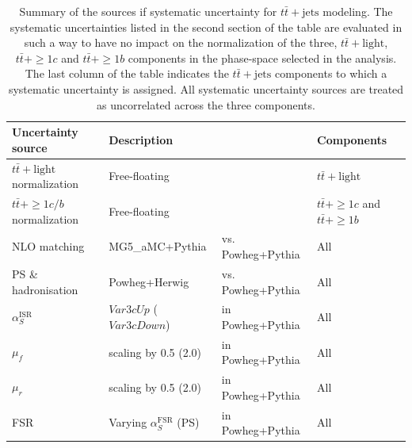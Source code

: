 \begin{table}[hp]
  \centering
  \begin{tabular*}{150mm}{@{\extracolsep{\fill}}llll}
    \hline\hline
    Uncertainty source & \multicolumn{2}{l}{Description} & Components\\
    \hline
    $t\bar{t}+\text{light}$ normalization & \multicolumn{2}{l}{Free-floating} & $t\bar{t}+\text{light}$\\
    $t\bar{t}+\geq1c/b$ normalization & \multicolumn{2}{l}{Free-floating} & $t\bar{t}+\geq{1c}$ and $t\bar{t}+\geq{1b}$\\
    \hline
    NLO matching & MG5\_aMC+Pythia & vs. Powheg+Pythia & All \\
    PS \& hadronisation & Powheg+Herwig & vs. Powheg+Pythia & All \\
    $\alpha_{S}^{\text{ISR}}$ & $Var3cUp$ ($Var3cDown$) & in Powheg+Pythia & All \\
    $\mu_{f}$ & scaling by 0.5 (2.0) & in Powheg+Pythia & All \\
    $\mu_{r}$ & scaling by 0.5 (2.0) & in Powheg+Pythia & All \\
    FSR & Varying $\alpha_{S}^{\text{FSR}}$ (PS) & in Powheg+Pythia & All \\
    \hline\hline
  \end{tabular*}
  \caption{Summary of the sources if systematic uncertainty for $t\bar{t}+\text{jets}$ modeling. The systematic uncertainties listed in the second section of the table are evaluated in such a way to have no impact on the normalization of the three, $t\bar{t}+\text{light}$, $t\bar{t}+\geq1c$ and $t\bar{t}+\geq1b$ components in the phase-space selected in the analysis. The last column of the table indicates the $t\bar{t}+\text{jets}$ components to which a systematic uncertainty is assigned. All systematic uncertainty sources are treated as uncorrelated across the three components.}
  \label{tb:TtbarSystSources}
\end{table}

